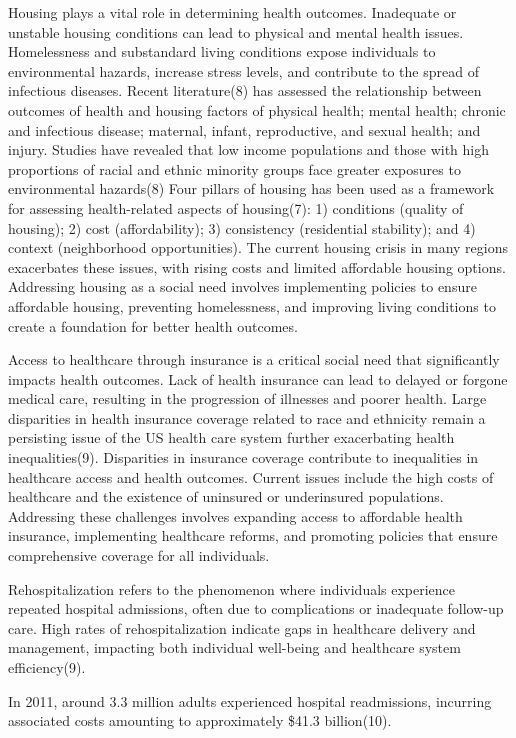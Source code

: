 \documentclass[12pt]{article}
\begin{document}
Housing plays a vital role in determining
health outcomes. Inadequate or unstable
housing conditions can lead to physical
and mental health issues. Homelessness
and substandard living conditions expose
individuals to environmental hazards,
increase stress levels, and contribute
to the spread of infectious diseases.
Recent literature(8) has assessed the relationship between outcomes of health 
and housing factors of physical health; mental health; chronic and infectious disease; maternal,
 infant, reproductive, and sexual health; and injury. Studies have revealed that low income 
 populations and those with high proportions of racial and ethnic minority groups face greater exposures to environmental hazards(8)
Four pillars of housing has been used as a framework for assessing health-related aspects of 
housing(7): 1) conditions (quality of housing); 2) cost (affordability); 3) consistency (residential stability); 
and 4) context (neighborhood opportunities).
The current housing crisis in many regions
exacerbates these issues, with rising
costs and limited affordable housing
options. Addressing housing as a social
need involves implementing policies to
ensure affordable housing, preventing
homelessness, and improving living
conditions to create a foundation for
better health outcomes.

Access to healthcare through insurance
is a critical social need that significantly
impacts health outcomes. Lack of health
insurance can lead to delayed or forgone
medical care, resulting in the progression
of illnesses and poorer health. 
Large disparities in health insurance coverage related to race and ethnicity remain a persisting issue of the US health care system
further exacerbating health inequalities(9).
Disparities in insurance coverage contribute
to inequalities in healthcare access and
health outcomes. Current issues include
the high costs of healthcare and the
existence of uninsured or underinsured
populations. Addressing these challenges
involves expanding access to affordable
health insurance, implementing healthcare
reforms, and promoting policies that
ensure comprehensive coverage for all
individuals.

Rehospitalization refers to the phenomenon
where individuals experience repeated
hospital admissions, often due to
complications or inadequate follow-up care.
High rates of rehospitalization indicate
gaps in healthcare delivery and management,
impacting both individual well-being and
healthcare system efficiency(9). 

In 2011, around 3.3 million adults experienced hospital readmissions, 
incurring associated costs amounting to approximately \$41.3 billion(10).
\end{document}
